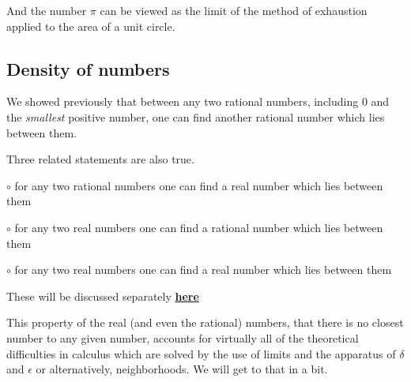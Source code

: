 \documentclass[11pt, oneside]{article}
\begin{document}
And the number $\pi$ can be viewed as the limit of the method of exhaustion applied to the area of a unit circle.

\subsection*{Density of numbers}

We showed previously that between any two rational numbers, including $0$ and the \emph{smallest} positive number, one can find another rational number which lies between them.

Three related statements are also true.

$\circ$ for any two rational numbers one can find a real number which lies between them

$\circ$ for any two real numbers one can find a rational number which lies between them

$\circ$ for any two real numbers one can find a real number which lies between them

These will be discussed separately \hyperref[sec:continuum]{\textbf{here}}

This property of the real (and even the rational) numbers, that there is no closest number to any given number, accounts for virtually all of the theoretical difficulties in calculus which are solved by the use of limits and the apparatus of $\delta$ and $\epsilon$ or alternatively, neighborhoods.  We will get to that in a bit.
\end{document}
